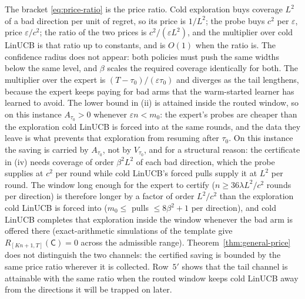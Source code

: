 \documentclass{article}
\theoremstyle{definition}
\theoremstyle{remark}
\newcommand{\eps}{\varepsilon}
\theoremstyle{remark}
\newcommand{\Cold}{\mathsf{C}}
\begin{document}
The bracket \eqref{eq:price-ratio} is the price ratio. Cold exploration buys
coverage $L^2$ of a bad direction per unit of regret, so its price is $1/L^2$;
the probe buys $c^2$ per $\eps$, price $\eps/c^2$; the ratio of the two prices
is $c^2/(\eps L^2)$, and the multiplier over cold LinUCB is that ratio up to
constants, and is $O(1)$ when the ratio is. The confidence radius does not
appear: both policies must push the same widths below the same level, and
$\beta$ scales the required coverage identically for both. The multiplier
over the expert is $(T-\tau_0)/(\eps\tau_0)$ and diverges as the tail
lengthens, because the expert keeps paying for bad arms that the warm-started
learner has learned to avoid. The lower bound in (ii) is attained inside the
routed window, so on this instance $A_{\tau_0}>0$ whenever $\eps n<m_0$: the
expert's probes are cheaper than the exploration cold LinUCB is forced into
at the same rounds, and the data they leave is what prevents that exploration
from resuming after $\tau_0$. On this instance the saving is carried by
$A_{\tau_0}$, not by $V_{\tau_0}$, and for a structural reason: the
certificate in (iv) needs coverage of order $\beta^2L^2$ of each bad
direction, which the probe supplies at $c^2$ per round while cold LinUCB's
forced pulls supply it at $L^2$ per round. The window long enough for the
expert to certify ($n\ge36\lambda L^2/c^2$ rounds per direction) is therefore
longer by a factor of order $L^2/c^2$ than the exploration cold LinUCB is
forced into ($m_0\le$ pulls $\le 8\beta^2+1$ per direction), and cold LinUCB
completes that exploration inside the window whenever the bad arm is offered
there (exact-arithmetic simulations of the template give
$R_{[Kn+1,T]}(\Cold)=0$ across the admissible range). Theorem~\ref{thm:general-price}
does not distinguish the two channels: the certified saving is bounded by the
same price ratio wherever it is collected. Row~$5'$ shows that the tail
channel is attainable with the same ratio when the routed window keeps cold
LinUCB away from the directions it will be trapped on later.
\end{document}
